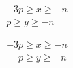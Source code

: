 \documentclass{book}
\begin{document}
\begin{gather*}
-3p \geq x \geq -n\\
p \geq y \geq -n
\end{gather*}

\begin{gather*}
-3p \geq x \geq -n\\
\phantom{-3}p \geq y \geq -n
\end{gather*}
\end{document}
